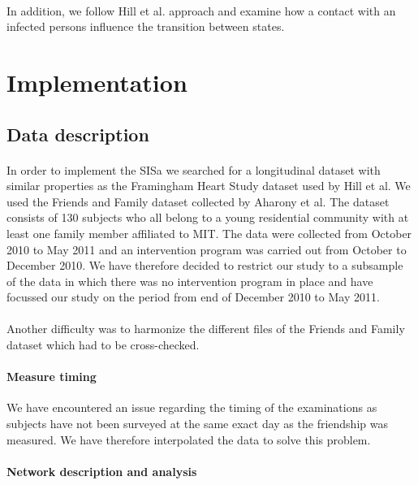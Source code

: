\documentclass[11pt]{article}
\begin{document}
\paragraph{}

In addition, we follow Hill et al. approach and examine how a contact with an infected persons influence the transition between states.

\section{Implementation}

\subsection{Data description}
\paragraph{}
In order to implement the SISa we searched for a longitudinal dataset with similar properties as the Framingham Heart Study dataset used by Hill et al. We used the Friends and Family dataset collected by Aharony et al. The dataset consists of 130 subjects who all belong to a young residential community with at least one family member affiliated to MIT. The data were collected from October 2010 to May 2011 and an intervention program was carried out from October to December 2010. We have therefore decided to restrict our study to a subsample of the data in which there was no intervention program in place and have focussed our study on the period from end of December 2010 to May 2011. 

\paragraph{}

Another difficulty was to harmonize the different files of the Friends and Family dataset which had to be cross-checked.

\paragraph{Measure timing}

We have encountered an issue regarding the timing of the examinations as subjects have not been surveyed at the same exact day as the friendship was measured. We have therefore interpolated the data to solve this problem.

\paragraph{Network description and analysis}
\end{document}
